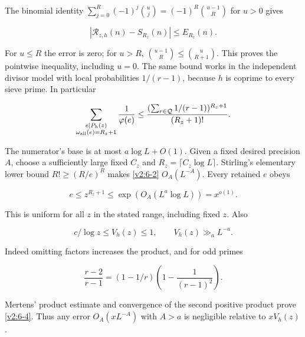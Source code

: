\documentclass[11pt]{article}
\theoremstyle{definition}
\theoremstyle{remark}
\numberwithin{equation}{section}
\begin{document}
The binomial identity $\sum_{j=0}^R(-1)^j\binom{u}{j}=(-1)^R\binom{u-1}{R}$ for $u>0$ gives


\begin{equation}\label{v2:6-1}
|\mathcal R_{z,h}(n)-S_{R_z}(n)|\le E_{R_z}(n).
\end{equation}


For $u\le R$ the error is zero; for $u>R$, $\binom{u-1}{R}\le\binom{u}{R+1}$. This proves the pointwise inequality, including $u=0$. The same bound works in the independent divisor model with local probabilities $1/(r-1)$, because $h$ is coprime to every sieve prime. In particular


\begin{equation}\label{v2:6-2}
\sum_{\substack{e\mid P_h(z)\\\omega_{\rm all}(e)=R_z+1}}\frac1{\varphi(e)}
\le \frac{(\sum_{r\in\mathcal Q}1/(r-1))^{R_z+1}}{(R_z+1)!}.
\end{equation}


The numerator's base is at most $a\log L+O(1)$. Given a fixed desired precision $A$, choose a sufficiently large fixed $C_z$ and $R_z=\lceil C_z\log L\rceil$. Stirling's elementary lower bound $R!\ge(R/e)^R$ makes \eqref{v2:6-2} $O_A(L^{-A})$. Every retained $e$ obeys


\begin{equation}\label{v2:6-3}
e\le z^{R_z+1}\le\exp(O_A(L^a\log L))=x^{o(1)}.
\end{equation}


This is uniform for all $z$ in the stated range, including fixed $z$. Also


\begin{equation}\label{v2:6-4}
c/\log z\le V_h(z)\le1,\qquad V_h(z)\gg_a L^{-a}.
\end{equation}


Indeed omitting factors increases the product, and for odd primes


\begin{equation}
\frac{r-2}{r-1}=(1-1/r)\left(1-\frac1{(r-1)^2}\right).
\end{equation}


Mertens' product estimate and convergence of the second positive product prove \eqref{v2:6-4}. Thus any error $O_A(xL^{-A})$ with $A>a$ is negligible relative to $xV_h(z)$.
\end{document}
